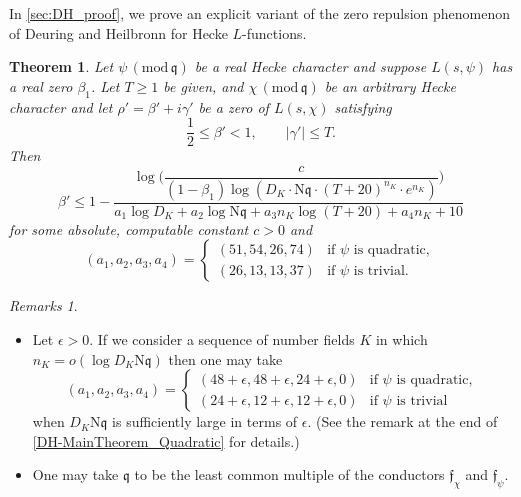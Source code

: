 \documentclass[12pt,psamsfonts]{amsart}
\newtheorem{thm}{Theorem}[section]
\theoremstyle{definition}
\theoremstyle{remark}
\numberwithin{equation}{section}
\theoremstyle{plain}
\theoremstyle{remark}
\newtheorem*{remarks}{Remarks}
\renewcommand{\1}{ {\bf 1}}
\newcommand{\kf}{\mathfrak{f}}
\renewcommand{\pmod}[1]{\, (\mathrm{mod} {\, #1})}
\newcommand{\N}{\mathrm{N}}
\newcommand{\kq}{\mathfrak{q}}
\begin{document}
In \cref{sec:DH_proof}, we prove an explicit variant of the zero repulsion phenomenon of Deuring and Heilbronn for Hecke $L$-functions.

\begin{thm} \label{DH-MainTheorem} Let $\psi \pmod{\kq}$ be a real Hecke character  and suppose $L(s,\psi)$ has a real zero $\beta_1$. Let $T \geq 1$ be given, and $\chi \pmod{\kq}$ be an arbitrary Hecke character and let $\rho' = \beta'+i\gamma'$ be a zero of $L(s,\chi)$ satisfying 
\begin{equation}
\frac{1}{2} \leq \beta' < 1, \qquad |\gamma'| \leq T. 
\label{DH-MainTheorem_BetaRange}
\end{equation}
Then 
\[
\beta' \leq 1 - \frac{ \log\Big( \dfrac{c}{(1-\beta_1) \log(D_K \cdot \N\kq \cdot (T+20)^{n_K} \cdot e^{n_K} ) } \Big) }{a_1  \log D_K + a_2 \log \N\kq  + a_3 n_K \log(T+20)  + a_4 n_K + 10}
\]
for some absolute, computable constant $c > 0$ and 
\[
(a_1,a_2,a_3,a_4) = 
\begin{cases}
(51, 54, 26, 74)  & \text{if $\psi$ is quadratic}, \\
(26, 13, 13, 37) & \text{if $\psi$ is trivial.}
\end{cases}
\]
\end{thm}  
\begin{remarks} $ $
\begin{itemize}
	\item 	 Let $\epsilon>0$.  If we consider a sequence of number fields $K$ in which $n_K = o(\log D_K \N\kq)$ then one may take
\[
(a_1,a_2,a_3,a_4) =
\begin{cases}
(48+\epsilon, 48+\epsilon, 24+\epsilon, 0)  & \text{if $\psi$ is quadratic}, \\
(24+\epsilon, 12+\epsilon, 12+\epsilon, 0) & \text{if $\psi$ is trivial}
\end{cases}
\]
when $D_K \N\kq$ is sufficiently large in terms of $\epsilon$. (See the remark at the end of \cref{DH-MainTheorem_Quadratic} for details.) 	
	\item One may take $\kq$ to be the least common multiple of the conductors $\kf_{\chi}$ and $\kf_{\psi}$. 
\end{itemize}

\end{remarks}

\end{document}
